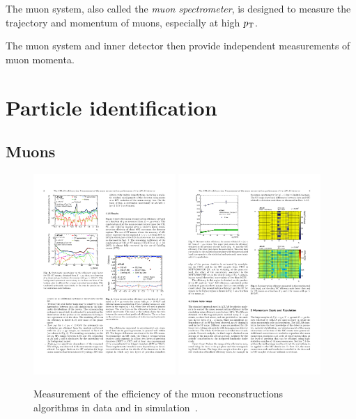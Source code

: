 The muon system, also called the \textit{muon spectrometer}, is designed to measure the trajectory and momentum of muons, especially at high $p_{\mathrm{T}}$. 

The muon system and inner detector then provide independent measurements of muon momenta. 

\section{Particle identification}
\label{sec:particles}

\subsection{Muons}

\begin{figure}[tp]
  \centering
  \includegraphics[width=0.48\textwidth]{figures/performance/muon-efficiency}
  \includegraphics[width=0.48\textwidth]{figures/performance/muon-efficiency-etaphi}
  \caption{Measurement of the efficiency of the muon reconstructions algorithms in data and in simulation~\cite{PERF-2014-05}.}
  \label{fig:objects-muon-efficiency}
\end{figure}
